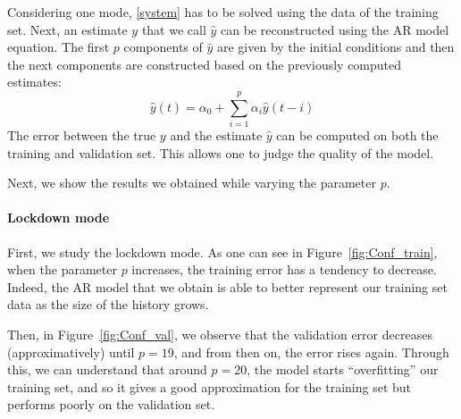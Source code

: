 \documentclass[11pt]{article}
\begin{document}
Considering one mode, \eqref{system} has to be solved using the data of the training set. Next, an estimate $y$ that we call $\hat{y}$ can be reconstructed using the AR model equation. The first $p$ components of $\hat{y}$ are given by the initial conditions and then the next components are constructed based on the previously computed estimates:
\begin{equation*}
    \hat{y}(t)=\alpha_0+\sum_{i=1}^p \alpha_i\hat{y}(t-i)
\end{equation*}
The error between the true $y$ and the estimate $\hat{y}$ can be computed on both the training and validation set. This allows one to judge the quality of the model.

Next, we show the results we obtained while varying the parameter \(p\).

\paragraph{Lockdown mode}
First, we study the lockdown mode.
As one can see in Figure~\ref{fig:Conf_train}, when the parameter \(p\) increases, the training error has a tendency to decrease. Indeed, the AR model that we obtain is able to better represent our training set data as the size of the history grows.

Then, in Figure~\ref{fig:Conf_val}, we observe that the validation error decreases (approximatively) until \(p = 19\), and from then on, the error rises again. Through this, we can understand that around \(p = 20\), the model starts ``overfitting'' our training set, and so it gives a good approximation for the training set but performs poorly on the validation set.
\end{document}
